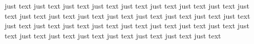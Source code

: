 just text just text just text
just text just text just text
just text just text just text
just text just text just text
just text just text just text
just text just text just text
just text just text just text
just text just text just text
just text just text just text
just text just text just text
just text just text just text
